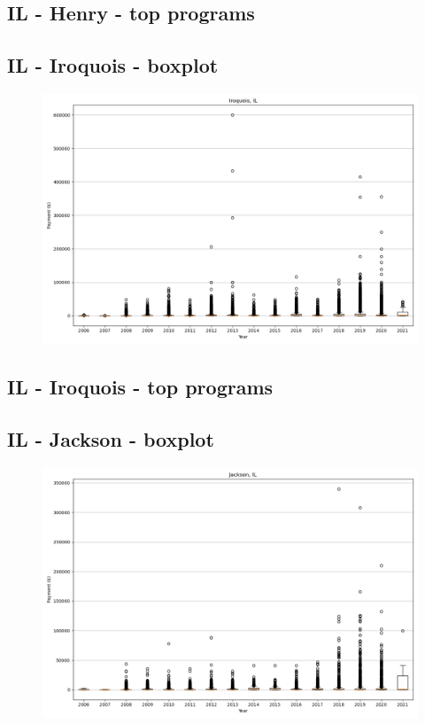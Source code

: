 \subsection*{IL - Henry - top programs}

\newpage
\subsection*{IL - Iroquois - boxplot}
\begin{figure}[h]
\centering
\includegraphics[width=7in]{../output/boxplots/counties/Iroquois-IL_boxplot.png}
\end{figure}


\subsection*{IL - Iroquois - top programs}

\newpage
\subsection*{IL - Jackson - boxplot}
\begin{figure}[h]
\centering
\includegraphics[width=7in]{../output/boxplots/counties/Jackson-IL_boxplot.png}
\end{figure}


